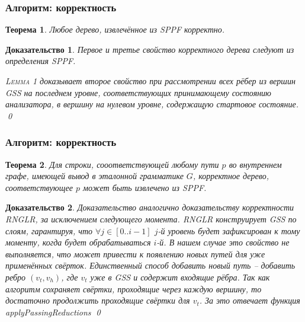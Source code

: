 \documentclass{beamer}
\newtheorem{rutheorem}{Теорема}
\newtheorem{ruproof}{Доказательство}
\begin{document}
\begin{frame}
    \transwipe[direction=90]
    \frametitle{Алгоритм: корректность}
    \begin{rutheorem}
       Любое дерево, извлечённое из SPPF корректно.
    \end{rutheorem}

    \begin{ruproof}
      Первое и третье свойство корректного дерева следуют из определения SPPF. 

      \textsc{Lemma 1} доказывает второе свойство при рассмотрении всех рёбер из вершин GSS на последнем уровне, соответствующих принимающему состоянию анализатора, в вершину на 
      нулевом уровне, содержащую стартовое состояние.
      \qed
    \end{ruproof}

\end{frame}

\begin{frame}
    \transwipe[direction=90]
    \frametitle{Алгоритм: корректность}
    \begin{rutheorem}
      Для строки, сооответствующей любому пути $p$ во внутреннем графе, имеющей вывод в эталонной грамматике $G$, корректное дерево, соответствующее $p$ может быть извлечено из SPPF.
    \end{rutheorem}

    \begin{ruproof}
Доказательство аналогично доказательству корректности RNGLR, за исключением следующего момента. RNGLR конструирует GSS по слоям, гарантируя, что $\forall j \in [0..i-1]$ $j$-й уровень будет зафиксирован к тому 
моменту, когда будет обрабатываться $i$-й. В нашем случае это свойство не выполняется, что может привести к появлению новых путей для уже применённых свёрток. Единственный способ добавить новый путь --
добавить ребро $(v_{t}, v_{h})$, где $v_{t}$ уже в GSS и содержит входящие рёбра. Так как алгоритм сохраняет свёртки, проходящие через каждую вершину, то достаточно продолжить проходящие свёртки 
для $v_{t}$. За это отвечает функция \emph{applyPassingReductions} 
\qed
    \end{ruproof}

\end{frame}
\end{document}
